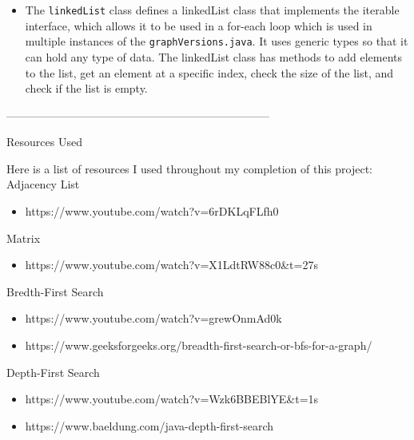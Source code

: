 \documentclass{article}
\begin{document}
\begin{itemize}

\item The \verb|linkedList| class defines a linkedList class that implements the iterable interface, which allows it to be used in a for-each loop which is used in multiple instances of the \verb|graphVersions.java|. It uses generic types so that it can hold any type of data. The linkedList class has methods to add elements to the list, get an element at a specific index, check the size of the list, and check if the list is empty.\\

\end{itemize}

 

\begin{center}
    -----------------------------------------------------------------------
\end{center}

\pagebreak

\begin{center}
\begin{large}
    Resources Used
\end{large}
\end{center}

Here is a list of resources I used throughout my completion of this project:\\

Adjacency List
    \begin{itemize}
        \item https://www.youtube.com/watch?v=6rDKLqFLfh0 
    \end{itemize}

Matrix
    \begin{itemize}
        \item https://www.youtube.com/watch?v=X1LdtRW88c0&t=27s
    \end{itemize}

Bredth-First Search
    \begin{itemize}
        \item https://www.youtube.com/watch?v=grewOnmAd0k
        \item https://www.geeksforgeeks.org/breadth-first-search-or-bfs-for-a-graph/ 
    \end{itemize}
    
Depth-First Search
    \begin{itemize}
        \item https://www.youtube.com/watch?v=Wzk6BBEBlYE&t=1s 
        \item https://www.baeldung.com/java-depth-first-search 
    \end{itemize}
\end{document}
